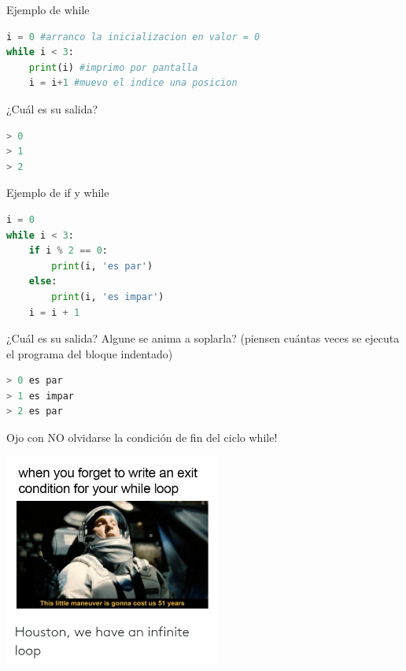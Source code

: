 \documentclass{beamer}
\begin{document}
\begin{frame}[fragile]{Ejemplo de while}
\begin{lstlisting}[language=Python]
i = 0 #arranco la inicializacion en valor = 0
while i < 3:
    print(i) #imprimo por pantalla
    i = i+1 #muevo el indice una posicion
\end{lstlisting} \pause

¿Cuál es su salida? \pause 
\begin{lstlisting}[language=Python]
> 0 
> 1
> 2
\end{lstlisting}
\end{frame}

\begin{frame}[fragile]{Ejemplo de if y while}
\begin{lstlisting}[language=Python]
i = 0
while i < 3:
    if i % 2 == 0:
        print(i, 'es par')
    else:
        print(i, 'es impar')
    i = i + 1

\end{lstlisting} \pause

¿Cuál es su salida? Algune se anima a soplarla? (piensen cuántas veces se ejecuta el programa del bloque indentado) \pause 
\begin{lstlisting}[language=Python]
> 0 es par
> 1 es impar
> 2 es par
\end{lstlisting}
\end{frame}

\begin{frame}{Ojo con NO olvidarse la condición de fin del ciclo while!} \pause
\begin{center}
\includegraphics[height=7cm, scale=1]{infinite_loop.png}
\end{center}
\end{frame}
\end{document}
